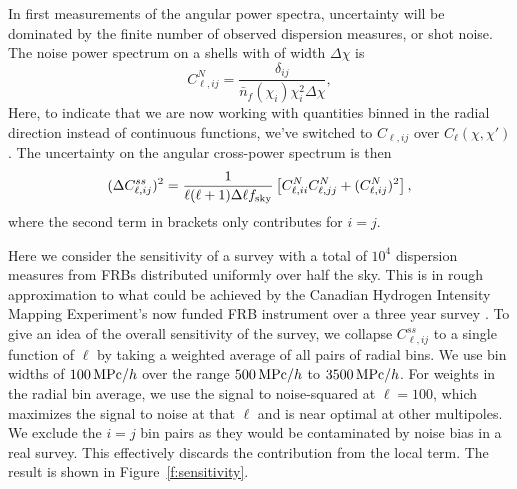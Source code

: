 \documentclass[twocolumn,prl,nofootinbib]{revtex4-1}
\begin{document}
In first measurements of the angular power spectra, uncertainty will be
dominated by the finite number of observed dispersion measures, or shot noise.
The noise power spectrum on a shells with of width
$\Delta \chi$ is
\begin{equation}
    C^N_{\ell, ij} = \frac{\delta_{ij}}{\bar n_f(\chi_i)\chi_i^2\Delta\chi},
\end{equation}
Here, to indicate that we are now working with quantities binned in the radial
direction instead of
continuous functions, we've switched to $C_{\ell,ij}$ over 
$C_\ell(\chi, \chi')$. The uncertainty on the angular
cross-power spectrum is then
\begin{align}
    (\Delta{C^{ss}_{\ell,ij}})^2 = 
    {\frac{1}{\ell(\ell + 1)\Delta \ell f_{\rm sky}}}
        \left[C^N_{\ell,ii} C^N_{\ell,jj} +  (C^N_{\ell,ij})^2\right],
\end{align}
where the second term in brackets only contributes for $i = j$.

Here we consider the sensitivity of a survey with a total of $10^4$ dispersion
measures from FRBs distributed uniformly over half the sky. This is in rough
approximation to what could be achieved by the Canadian Hydrogen Intensity
Mapping Experiment's now funded FRB instrument over a three year survey
\citep{who}.
To give an idea of the overall sensitivity of the survey, we collapse
$C^{ss}_{\ell,ij}$ to a single function of $\ell$ by taking a weighted average
of all pairs of radial bins. We use bin widths of $100\,{\rm MPc}/h$ over the
range $500\,{\rm MPc}/h$ to $3500\,{\rm MPc}/h$.
For weights in the radial bin average, we use the signal to noise-squared
at $\ell=100$, which maximizes the signal to noise at that $\ell$ and
is near optimal at other multipoles.
We exclude the $i = j$ bin pairs
as they would be contaminated by noise bias in a real survey.
This effectively discards the contribution from the local term. The result is shown
in Figure~\ref{f:sensitivity}.
\end{document}
